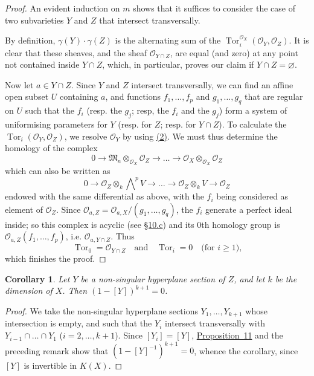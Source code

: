 \documentclass{article}
\theoremstyle{plain}
\newtheorem*{corollary}{Corollary}
\theoremstyle{definition}
\newcommand{\scr}[1]{{\mathscr{#1}}}
\renewcommand{\geq}{\geqslant}
\DeclareMathOperator{\Tor}{Tor}
\newcommand{\oldpage}[1]{\marginpar{\footnotesize$\Big\vert$ \textit{p.~#1}}}
\begin{document}
\begin{proof}
  An evident induction on $m$ shows that it suffices to consider the case of two subvarieties $Y$ and $Z$ that intersect transversally.

  By definition, $\gamma(Y)\cdot\gamma(Z)$ is the alternating sum of the $\Tor_i^{\scr{O}_X}(\scr{O}_Y,\scr{O}_Z)$.
  It is clear that these sheaves, and the sheaf $\scr{O}_{Y\cap Z}$, are equal (and zero) at any point not contained inside $Y\cap Z$, which, in particular, proves our claim if $Y\cap Z=\varnothing$.

  Now let $a\in Y\cap Z$.
  Since $Y$ and $Z$ intersect transversally, we can find an affine open subset $U$ containing $a$, and functions $f_1,\ldots,f_p$ and $g_1,\ldots,g_q$ that are regular on $U$ such that the $f_i$ (resp. the $g_j$; resp, the $f_i$ and the $g_j$) form a system of uniformising parameters for $Y$ (resp. for $Z$; resp. for $Y\cap Z$).
  To calculate the $\Tor_i(\scr{O}_Y,\scr{O}_Z)$, we resolve $\scr{O}_Y$ by using \hyperref[section10cequation2]{(2)}.
  We must thus determine the homology of the complex
  \[
    0 \to \mathfrak{M}_n\otimes_{\scr{O}_X}\scr{O}_Z \to \ldots \to \scr{O}_X\otimes_{\scr{O}_X}\scr{O}_Z
  \]
  which can also be written as
  \[
    0 \to \scr{O}_Z\otimes_k\bigwedge\nolimits^p V \to \ldots \to \scr{O}_Z\otimes_k V \to \scr{O}_Z
  \]
  endowed with the same differential as above, with the $f_i$ being considered as element of $\scr{O}_Z$.
  Since $\scr{O}_{a,Z} = \scr{O}_{a,X}/(g_1,\ldots,g_q)$, the $f_i$ generate a perfect ideal inside;
  so this complex is acyclic (see \hyperref[subsection10c]{\S10.c}) and its $0$th homology group is $\scr{O}_{a,Z}(f_1,\ldots,f_p)$, i.e. $\scr{O}_{a,Y\cap Z}$.
  Thus
  \[
    \Tor_0 = \scr{O}_{Y\cap Z}
    \quad\text{and}\quad
    \Tor_i = 0
    \quad\mbox{(for $i\geq1$),}
  \]
  which finishes the proof.
\end{proof}

\oldpage{122}
\begin{corollary}
\label{corollary-11}
  Let $Y$ be a non-singular hyperplane section of $Z$, and let $k$ be the dimension of $X$.
  Then $(1-[Y])^{k+1}=0$.
\end{corollary}

\begin{proof}
  We take the non-singular hyperplane sections $Y_1,\ldots,Y_{k+1}$ whose intersection is empty, and such that the $Y_i$ intersect transversally with $Y_{i-1}\cap\ldots\cap Y_1$ ($i=2,\ldots,k+1$).
  Since $[Y_i]=[Y]$, \hyperref[proposition11]{Proposition~11} and the preceding remark show that $(1-[Y]^{-1})^{k+1} = 0$, whence the corollary, since $[Y]$ is invertible in $K(X)$.
\end{proof}
\end{document}
